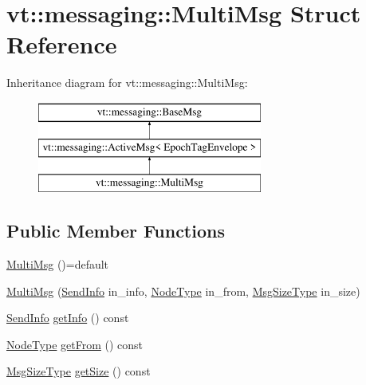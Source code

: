 \hypertarget{structvt_1_1messaging_1_1_multi_msg}{}\section{vt\+:\+:messaging\+:\+:Multi\+Msg Struct Reference}
\label{structvt_1_1messaging_1_1_multi_msg}
Inheritance diagram for vt\+:\+:messaging\+:\+:Multi\+Msg\+:\begin{figure}[H]
\begin{center}
\leavevmode
\includegraphics[height=3.000000cm]{structvt_1_1messaging_1_1_multi_msg}
\end{center}
\end{figure}
\subsection*{Public Member Functions}
\begin{DoxyCompactItemize}
\item 
\hyperlink{structvt_1_1messaging_1_1_multi_msg_a1f4aa450c0ff93dd39b6d92ebf608ada}{Multi\+Msg} ()=default
\item 
\hyperlink{structvt_1_1messaging_1_1_multi_msg_acd927cddf86133a0cf418ac8e44ccea0}{Multi\+Msg} (\hyperlink{structvt_1_1messaging_1_1_send_info}{Send\+Info} in\+\_\+info, \hyperlink{namespacevt_a866da9d0efc19c0a1ce79e9e492f47e2}{Node\+Type} in\+\_\+from, \hyperlink{namespacevt_a408e86a8c7c89309b52907dc5a513924}{Msg\+Size\+Type} in\+\_\+size)
\item 
\hyperlink{structvt_1_1messaging_1_1_send_info}{Send\+Info} \hyperlink{structvt_1_1messaging_1_1_multi_msg_a199e909c6fe0ad3dac7a9204311c3e58}{get\+Info} () const
\item 
\hyperlink{namespacevt_a866da9d0efc19c0a1ce79e9e492f47e2}{Node\+Type} \hyperlink{structvt_1_1messaging_1_1_multi_msg_aafefb2ed9f0321e9c4b746a3168eec8c}{get\+From} () const
\item 
\hyperlink{namespacevt_a408e86a8c7c89309b52907dc5a513924}{Msg\+Size\+Type} \hyperlink{structvt_1_1messaging_1_1_multi_msg_a5dd6e171088baef677075e3f29d694f5}{get\+Size} () const
\end{DoxyCompactItemize}
